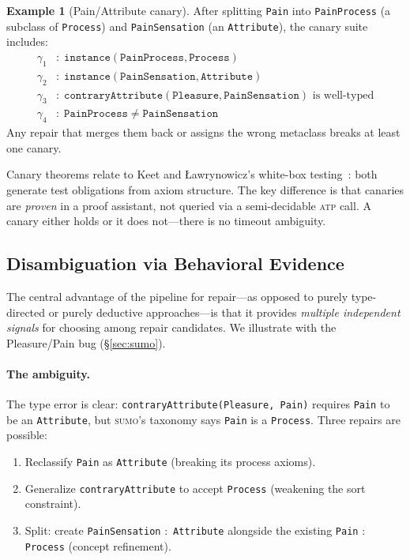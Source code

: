 \documentclass[11pt]{article}
\newcommand{\SUMO}{\textsc{sumo}}
\newcommand{\ATP}{\textsc{atp}}
\theoremstyle{definition}
\newtheorem{example}{Example}[section]
\theoremstyle{plain}
\begin{document}
\begin{example}[Pain/Attribute canary]
\label{ex:pain-canary}
After splitting \texttt{Pain} into \texttt{PainProcess} (a subclass
of \texttt{Process}) and \texttt{PainSensation} (an \texttt{Attribute}),
the canary suite includes:
\begin{align*}
  \gamma_1 &:\; \texttt{instance}(\texttt{PainProcess}, \texttt{Process}) \\
  \gamma_2 &:\; \texttt{instance}(\texttt{PainSensation}, \texttt{Attribute}) \\
  \gamma_3 &:\; \texttt{contraryAttribute}(\texttt{Pleasure},
    \texttt{PainSensation}) \text{ is well-typed} \\
  \gamma_4 &:\; \texttt{PainProcess} \neq \texttt{PainSensation}
\end{align*}
Any repair that merges them back or assigns the wrong metaclass breaks
at least one canary.
\end{example}

Canary theorems relate to Keet and \L{}awrynowicz's white-box
testing~\cite{keet2017whitebox}: both generate test obligations from
axiom structure.  The key difference is that canaries are \emph{proven}
in a proof assistant, not queried via a semi-decidable \ATP{} call.
A canary either holds or it does not---there is no timeout ambiguity.

\subsection{Disambiguation via Behavioral Evidence}
\label{sec:disambiguation}

The central advantage of the pipeline for repair---as opposed to purely
type-directed or purely deductive approaches---is that it provides
\emph{multiple independent signals} for choosing among repair
candidates.  We illustrate with the Pleasure/Pain bug
(\S\ref{sec:sumo}).

\paragraph{The ambiguity.}
The type error is clear: \texttt{contraryAttribute(Pleasure, Pain)}
requires \texttt{Pain} to be an \texttt{Attribute}, but \SUMO{}'s
taxonomy says \texttt{Pain} is a \texttt{Process}.
Three repairs are possible:
\begin{enumerate}[label=(\alph*),nosep]
  \item Reclassify \texttt{Pain} as \texttt{Attribute} (breaking its
    process axioms).
  \item Generalize \texttt{contraryAttribute} to accept
    \texttt{Process} (weakening the sort constraint).
  \item Split: create \texttt{PainSensation} $:$ \texttt{Attribute}
    alongside the existing \texttt{Pain} $:$ \texttt{Process}
    (concept refinement).
\end{enumerate}
\end{document}
